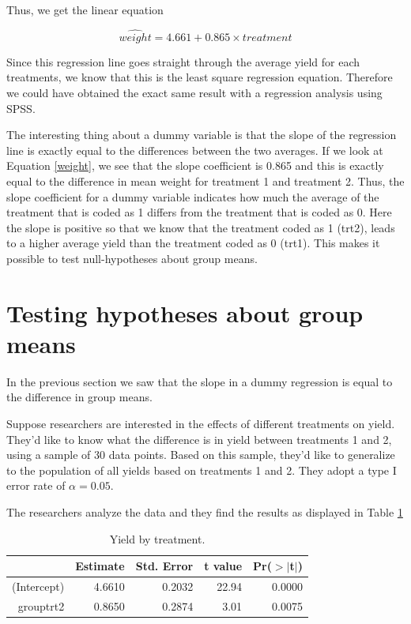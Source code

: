 \documentclass[]{report}\usepackage[]{graphicx}\usepackage[]{color}
\begin{document}
Thus, we get the linear equation 

\begin{equation}
\label{weight}
\widehat{weight} = 4.661 + 0.865\times treatment
\end{equation}

Since this regression line goes straight through the average yield for each treatments, we know that this is the least square regression equation. Therefore we could have obtained the exact same result with a regression analysis using SPSS. 

The interesting thing about a dummy variable is that the slope of the regression line is exactly equal to the differences between the two averages. If we look at Equation \ref{weight}, we see that the slope coefficient is 0.865 and this is exactly equal to the difference in mean weight for treatment 1 and treatment 2. Thus, the slope coefficient for a dummy variable indicates how much the average of the treatment that is coded as 1 differs from the treatment that is coded as 0. Here the slope is positive so that we know that the treatment coded as 1 (trt2), leads to a higher average yield than the treatment coded as 0 (trt1). This makes it possible to test null-hypotheses about group means.

\section{Testing hypotheses about group means}

In the previous section we saw that the slope in a dummy regression is equal to the difference in group means.

Suppose researchers are interested in the effects of different treatments on yield. They'd like to know what the difference is in yield between treatments 1 and 2, using a sample of 30 data points. Based on this sample, they'd like to generalize to the population of all yields based on treatments 1 and 2. They adopt a type I error rate of $\alpha=0.05$.

The researchers analyze the data and they find the results as displayed in Table \ref{tab:dummy_9}

\begin{table}[ht]
\centering
\caption{Yield by treatment.} 
\label{tab:dummy_9}
\begin{tabular}{rrrrr}
  \hline
 & Estimate & Std. Error & t value & Pr($>$$|$t$|$) \\ 
  \hline
(Intercept) & 4.6610 & 0.2032 & 22.94 & 0.0000 \\ 
  grouptrt2 & 0.8650 & 0.2874 & 3.01 & 0.0075 \\ 
   \hline
\end{tabular}
\end{table}
\end{document}
